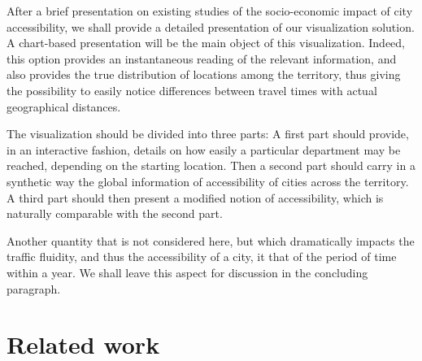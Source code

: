 \documentclass{vgtc}                          %
\begin{document}

After a brief presentation on existing studies of the socio-economic impact of city accessibility, we shall provide a detailed presentation of our visualization solution. A chart-based presentation will be the main object of this visualization. Indeed, this option provides an instantaneous reading of the relevant information, and also provides the true distribution of locations among the territory, thus giving the possibility to easily notice differences between travel times with actual geographical distances. 

The visualization should be divided into three parts: A first part should provide, in an interactive fashion, details on how easily a particular department may be reached, depending on the starting location. Then a second part should carry in a synthetic way the global information of accessibility of cities across the territory. A third part should then present a modified notion of accessibility, which is naturally comparable with the second part.





 Another quantity that is not considered here, but which dramatically impacts the traffic fluidity, and thus the accessibility of a city, it that of the period of time within a year. We shall leave this aspect for discussion in the concluding paragraph. 


\vspace{0.2cm}
\section{Related work}

\vspace{0.1cm}


\end{document}
